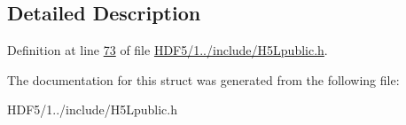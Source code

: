 \subsection{Detailed Description}


Definition at line \hyperlink{_h_d_f5_21_810_81_2include_2_h5_lpublic_8h_source_l00073}{73} of file \hyperlink{_h_d_f5_21_810_81_2include_2_h5_lpublic_8h_source}{H\+D\+F5/1../include/\+H5\+Lpublic.\+h}.



The documentation for this struct was generated from the following file\+:\begin{DoxyCompactItemize}
\item 
H\+D\+F5/1../include/\+H5\+Lpublic.\+h\end{DoxyCompactItemize}
